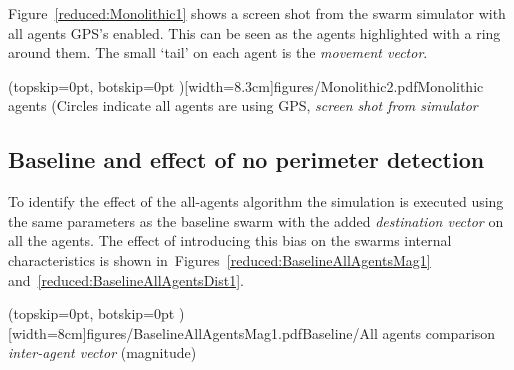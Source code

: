 \documentclass{ieeeaccess}
\begin{document}
Figure~\ref{reduced:Monolithic1} shows a screen shot from the swarm simulator with all agents GPS's enabled. This can be seen as the agents highlighted with a ring around them. The small `tail' on each agent is the \textit{movement vector}.


\Figure[t!](topskip=0pt, botskip=0pt )[width=8.3cm]{figures/Monolithic2.pdf}{Monolithic agents (Circles indicate all agents are using GPS, \textit{screen shot from simulator}\label{reduced:Monolithic1}}

\subsection{Baseline and effect of no perimeter detection\label{section:compareBaselineNoPerimeter}}
To identify the effect of the all-agents algorithm the simulation is executed using the same parameters as the baseline swarm with the added \textit{destination vector} on all the agents. The effect of introducing this bias on the swarms internal characteristics is shown in~Figures~\ref{reduced:BaselineAllAgentsMag1} and~\ref{reduced:BaselineAllAgentsDist1}.

\Figure[t!](topskip=0pt, botskip=0pt )[width=8cm]{figures/BaselineAllAgentsMag1.pdf}{Baseline/All agents comparison \textit{inter-agent vector} (magnitude)\label{reduced:BaselineAllAgentsMag1}}
\end{document}
